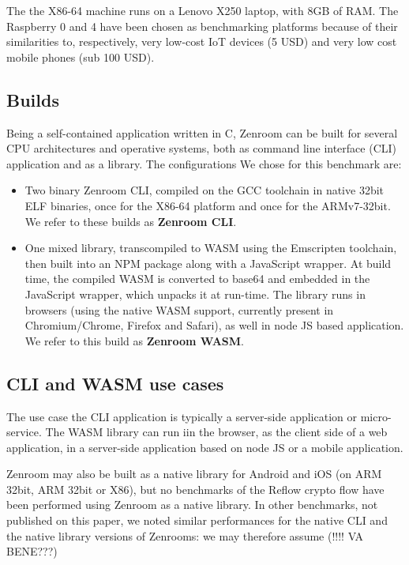 \documentclass[twocolumn]{article}
\begin{document}
The the X86-64 machine runs on a Lenovo X250 laptop, with 8GB of RAM.  
The Raspberry 0 and 4 have been chosen as benchmarking platforms because of their similarities to, respectively, very low-cost IoT devices (5 USD) and very low cost mobile phones (sub 100 USD).

\subsection*{Builds} 

Being a self-contained application written in C, Zenroom can be built for several CPU architectures and operative systems, both as command line interface (CLI) application and as a library. The configurations We chose for this benchmark are: 

\begin{itemize}
\item Two binary Zenroom CLI, compiled on the GCC toolchain in native 32bit ELF binaries, once for the X86-64 platform and once for the ARMv7-32bit. We refer to these builds as \textbf{Zenroom CLI}. 

\item One mixed library, transcompiled to WASM using the Emscripten toolchain, then built into an NPM package along with a JavaScript wrapper. At build time, the compiled WASM is converted to base64 and embedded in the JavaScript wrapper, which unpacks it at run-time. 
The library runs in browsers (using the native WASM support, currently present in Chromium/Chrome, Firefox and Safari), as well in node JS based application. We refer to this build as \textbf{Zenroom WASM}. 
\end{itemize}

\subsection*{CLI and WASM use cases} 

The use case the CLI application is typically a server-side application or micro-service. The WASM library can run iin the browser, as the client side of a web application, in a server-side application based on node JS or a mobile application.

Zenroom may also be built as a native library for Android and iOS (on ARM 32bit, ARM 32bit or X86), but no benchmarks of the Reflow crypto flow have been performed using Zenroom as a native library. 
In other benchmarks, not published on this paper, we noted similar performances for the native CLI and the native library versions of Zenrooms: we may therefore assume (!!!! VA BENE???)  
\end{document}
